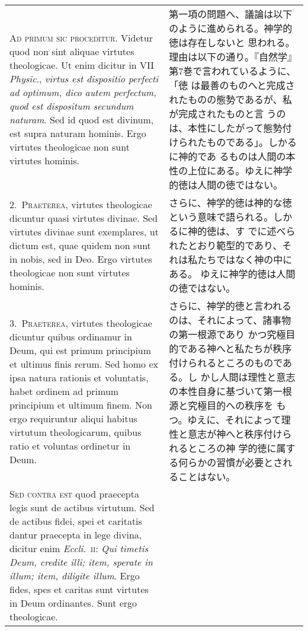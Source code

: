 \documentclass[10pt]{jsarticle}
\begin{document}
\begin{longtable}{p{21em}p{21em}}
{\scshape Ad primum sic proceditur}. Videtur quod non sint aliquae
virtutes theologicae. Ut enim dicitur in VII {\itshape Physic}.,
{\itshape virtus est dispositio perfecti ad optimum, dico autem
perfectum, quod est dispositum secundum naturam}. Sed id quod est
divinum, est supra naturam hominis. Ergo virtutes theologicae non sunt
virtutes hominis.

&

 第一項の問題へ、議論は以下のように進められる。神学的徳は存在しないと
 思われる。理由は以下の通り。『自然学』第7巻で言われているように、「徳
 は最善のものへと完成されたものの態勢であるが、私が完成されたものと言
 うのは、本性にしたがって態勢付けられたものである」。しかるに神的であ
 るものは人間の本性の上位にある。ゆえに神学的徳は人間の徳ではない。

 
\\



2.~{\scshape Praeterea}, virtutes theologicae dicuntur quasi virtutes
divinae. Sed virtutes divinae sunt exemplares, ut dictum est, quae
quidem non sunt in nobis, sed in Deo. Ergo virtutes theologicae non
sunt virtutes hominis.

&

 さらに、神学的徳は神的な徳という意味で語られる。しかるに神的徳は、す
 でに述べられたとおり範型的であり、それは私たちではなく神の中にある。
 ゆえに神学的徳は人間の徳ではない。
 
\\


3.~{\scshape Praeterea}, virtutes theologicae dicuntur quibus
ordinamur in Deum, qui est primum principium et ultimus finis
rerum. Sed homo ex ipsa natura rationis et voluntatis, habet ordinem
ad primum principium et ultimum finem. Non ergo requiruntur aliqui
habitus virtutum theologicarum, quibus ratio et voluntas ordinetur in
Deum.

&

 さらに、神学的徳と言われるのは、それによって、諸事物の第一根源であり
 かつ究極目的である神へと私たちが秩序付けられるところのものである。し
 かし人間は理性と意志の本性自身に基づいて第一根源と究極目的への秩序を
 もつ。ゆえに、それによって理性と意志が神へと秩序付けられるところの神
 学的徳に属する何らかの習慣が必要とされることはない。
 
\\



{\scshape Sed contra est} quod praecepta legis sunt de actibus
virtutum. Sed de actibus fidei, spei et caritatis dantur praecepta in
lege divina, dicitur enim {\itshape Eccli}.~{\scshape ii}: {\itshape
Qui timetis Deum, credite illi; item, sperate in illum; item, diligite
illum}. Ergo fides, spes et caritas sunt virtutes in Deum
ordinantes. Sunt ergo theologicae.


\end{longtable}
\end{document}
